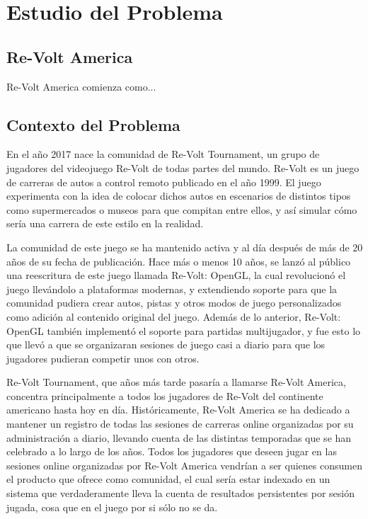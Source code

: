 \chapter{Estudio del Problema}

\section{Re-Volt America}
Re-Volt America comienza como...

\section{Contexto del Problema}
En el año 2017 nace la comunidad de Re-Volt Tournament,  un grupo de jugadores del videojuego Re-Volt de todas partes del mundo. Re-Volt es un juego de carreras de autos a control remoto publicado en el año 1999. El juego experimenta con la idea de colocar dichos autos en escenarios de distintos tipos como supermercados o museos para que compitan entre ellos, y así simular cómo sería una carrera de este estilo en la realidad.

La comunidad de este juego se ha mantenido activa y al día después de más de 20 años de su fecha de publicación. Hace más o menos 10 años, se lanzó al público una reescritura de este juego llamada Re-Volt: OpenGL, la cual revolucionó el juego llevándolo a plataformas modernas, y extendiendo soporte para que la comunidad pudiera crear autos, pistas y otros modos de juego personalizados como adición al contenido original del juego. Además de lo anterior, Re-Volt: OpenGL también implementó el soporte para partidas multijugador, y fue esto lo que llevó a que se organizaran sesiones de juego casi a diario para que los jugadores pudieran competir unos con otros.

Re-Volt Tournament, que años más tarde pasaría a llamarse Re-Volt America, concentra principalmente a todos los jugadores de Re-Volt del continente americano hasta hoy en día.
Históricamente, Re-Volt America se ha dedicado a mantener un registro de todas las sesiones de carreras online organizadas por su administración a diario, llevando cuenta de las distintas temporadas que se han celebrado a lo largo de los años. Todos los jugadores que deseen jugar en las sesiones online organizadas por Re-Volt America vendrían a ser quienes consumen el producto que ofrece como comunidad, el cual sería estar indexado en un sistema que verdaderamente lleva la cuenta de resultados persistentes por sesión jugada, cosa que en el juego por si sólo no se da.

